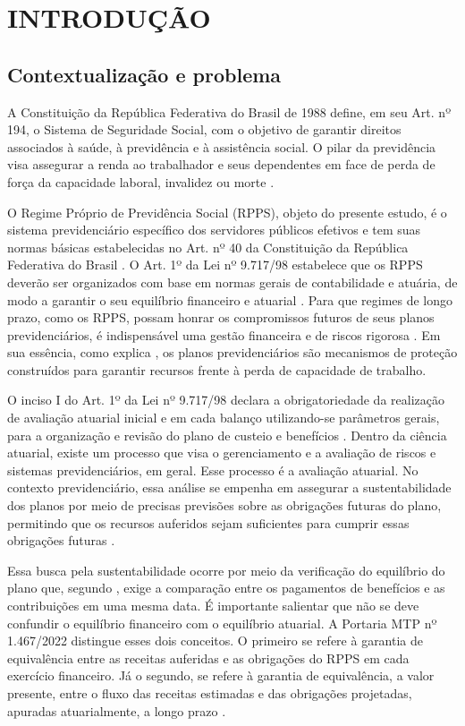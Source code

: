 \chapter{\textbf{INTRODUÇÃO}}

\section{\textbf{Contextualização e problema}}

A Constituição da República Federativa do Brasil de 1988 define, em seu Art. nº 194, o Sistema de Seguridade Social, com o objetivo de garantir direitos associados à saúde, à previdência e à assistência social. O pilar da previdência visa assegurar a renda ao trabalhador e seus dependentes em face de perda de força da capacidade laboral, invalidez ou morte \cite{brasil1988constituicao}.

O Regime Próprio de Previdência Social (RPPS), objeto do presente estudo, é o sistema previdenciário específico dos servidores públicos efetivos e tem suas normas básicas estabelecidas no Art. nº 40 da Constituição da República Federativa do Brasil \cite{brasil1988constituicao}. O Art. 1º da Lei nº 9.717/98 estabelece que os RPPS deverão ser organizados com base em normas gerais de contabilidade e atuária, de modo a garantir o seu equilíbrio financeiro e atuarial \cite{PL7776_2010}. Para que regimes de longo prazo, como os RPPS, possam honrar os compromissos futuros de seus planos previdenciários, é indispensável uma gestão financeira e de riscos rigorosa \cite{bogoni2011}. Em sua essência, como explica , os planos previdenciários são mecanismos de proteção construídos para garantir recursos frente à perda de capacidade de trabalho.

O inciso I do Art. 1º da Lei nº 9.717/98 declara a obrigatoriedade da realização de avaliação atuarial inicial e em cada balanço utilizando-se parâmetros gerais, para a organização e revisão do plano de custeio e benefícios \cite{PL7776_2010}. Dentro da ciência atuarial, existe um processo que visa o gerenciamento e a avaliação de riscos e sistemas previdenciários, em geral. Esse processo é a avaliação atuarial. No contexto previdenciário, essa análise se empenha em assegurar a sustentabilidade dos planos por meio de precisas previsões sobre as obrigações futuras do plano, permitindo que os recursos auferidos sejam suficientes para cumprir essas obrigações futuras \cite{micoccini2010}.

Essa busca pela sustentabilidade ocorre por meio da verificação do equilíbrio do plano que, segundo , exige a comparação entre os pagamentos de benefícios e as contribuições em uma mesma data. É importante salientar que não se deve confundir o equilíbrio financeiro com o equilíbrio atuarial. A Portaria MTP nº 1.467/2022 distingue esses dois conceitos. O primeiro se refere à garantia de equivalência entre as receitas auferidas e as obrigações do RPPS em cada exercício financeiro. Já o segundo, se refere à garantia de equivalência, a valor presente, entre o fluxo das receitas estimadas e das obrigações projetadas, apuradas atuarialmente, a longo prazo \cite{mtp1467_2022}.

